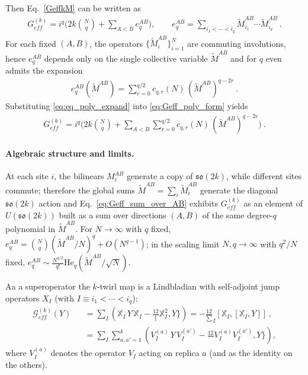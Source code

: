 \documentclass{article}
\theoremstyle{definition}
\newcommand{\nn}{\nonumber}
\begin{document}
    Then Eq.~\ref{GeffkM} can be written as
    \begin{eqnarray}
        \label{eq:Geff_poly_form} G^{(k)}_{eff} = i^{q}\Bigg(2k\binom{N}{q}+\sum_{A<B}
        e_q^{AB}\Bigg), \qquad e_q^{AB}=\sum_{i_1<\cdots<i_q}\tilde M^{AB}_{i_1}\cdots
        \tilde M^{AB}_{i_q}\ .
    \end{eqnarray}
    For each fixed $(A,B)$, the operators $\{\tilde M^{AB}_{i}\}_{i=1}^{N}$ are commuting
    involutions, hence $e_{q}^{AB}$ depends only on the single collective
    variable $\tilde M^{AB}$ and for $q$ even admits the expansion
    \begin{eqnarray}
        \label{eq:eq_poly_expand} e_q^{AB}(\tilde M^{AB})=\sum_{r=0}^{q/2} c_{q,r}(N)\,(\tilde
        M^{AB})^{q-2r}\ .
    \end{eqnarray}
    Substituting \eqref{eq:eq_poly_expand} into \eqref{eq:Geff_poly_form} yields
    \begin{eqnarray}
        \label{eq:Geff_sum_over_AB} G^{(k)}_{eff} = i^{q}\Bigg(2k\binom{N}{q} +\sum_{A<B}\sum_{r=0}^{q/2}
        c_{q,r}(N)\,(\tilde M^{AB})^{q-2r}\Bigg)\ .
    \end{eqnarray}

    \paragraph{Algebraic structure and limits.}
    At each site $i$, the bilinears $M^{AB}_{i}$ generate a copy of $\mathfrak{so}
    (2k)$, while different sites commute; therefore the global sums $\tilde M^{AB}
    =\sum_{i}\tilde M^{AB}_{i}$ generate the diagonal $\mathfrak{so}(2k)$ action
    and Eq.~\eqref{eq:Geff_sum_over_AB} exhibits $G^{(k)}_{eff}$ as an element of
    $U(\mathfrak{so}(2k))$ built as a sum over directions $(A,B)$ of the same degree-$q$
    polynomial in $\tilde M^{AB}$. For $N\to\infty$ with $q$ fixed, $e_{q}^{AB}=\binom
    {N}{q}(\tilde M^{AB}/N)^{q}+O(N^{q-1})$; in the scaling limit $N,q\to\infty$
    with $q^{2}/N$ fixed, $e_{q}^{AB}\sim \frac{N^{q/2}}{q!}\mathrm{He}_{q}(\tilde
    M^{AB}/\sqrt{N})$.

    Aa a superoperator the $k$-twirl map is a Lindbladian with self-adjoint jump
    operators $X_{I}$ (with $I\equiv i_{1}<\cdots<i_{q}$):
    \begin{eqnarray}
        \mathcal{G}^{(k)}_{eff}(Y) &&=\sum_I\!\left(\mathbb{X}_I\,Y\,\mathbb{X}_I-\frac{12}{\{}\mathbb{X}_I^2,Y\}\right)
        =-\frac{12}{\sum}_I [\mathbb{X}_I,[\mathbb{X}_I,Y]]\,,\nn\\
        &&=\sum_{I} \sum_{a,a'=1}^k\!\left(V_I^{(a)}\,Y\,V_I^{(a')}-\frac{12}{}V_I^{(a)}V_I^{(a')},Y\}\right),
    \end{eqnarray}
    where $V_{I}^{(a)}$ denotes the operator $V_{I}$ acting on replica $a$ (and as
    the identity on the others).
\end{document}

